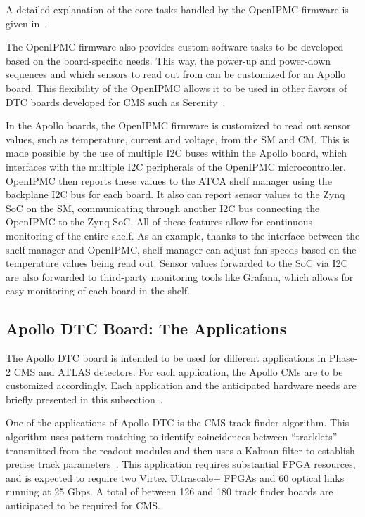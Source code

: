 A detailed explanation of the core tasks handled by the OpenIPMC firmware is given in~\cite{Calligaris:OpenIPMC}.

The OpenIPMC firmware also provides custom software tasks to be developed based on the board-specific needs.
This way, the power-up and power-down sequences and which sensors to read out from can be customized for an
Apollo board. This flexibility of the OpenIPMC allows it to be used in other flavors of DTC boards developed
for CMS such as Serenity~\cite{CMS:SerenityPaper}.

In the Apollo boards, the OpenIPMC firmware is customized to read out sensor values, such as temperature, 
current and voltage, from the SM and CM. 
This is made possible by the use of multiple I2C buses within the Apollo board, which
interfaces with the multiple I2C peripherals of the OpenIPMC microcontroller. OpenIPMC then reports these
values to the ATCA shelf manager using the backplane I2C bus for each board. It also can report sensor values
to the Zynq SoC on the SM, communicating through another I2C bus connecting the OpenIPMC to the Zynq SoC. 
All of these features allow for continuous 
monitoring of the entire shelf. As an example, thanks to the interface between the shelf manager and OpenIPMC,
shelf manager can adjust fan speeds based on the temperature values being read out. Sensor values forwarded to
the SoC via I2C are also forwarded to third-party monitoring tools like Grafana, which allows for easy monitoring
of each board in the shelf. 

\subsection{Apollo DTC Board: The Applications}

The Apollo DTC board is intended to be used for different applications in Phase-2 CMS and ATLAS detectors.
For each application, the Apollo CMs are to be customized accordingly. Each application and the anticipated
hardware needs are briefly presented in this subsection~\cite{CMS:ApolloPaper}.

One of the applications of Apollo DTC is the CMS track finder algorithm. This algorithm uses 
pattern-matching to identify coincidences between “tracklets”
transmitted from the readout modules and then uses a Kalman filter to establish precise track 
parameters~\cite{CMS:ApolloPaper}. This application requires substantial FPGA resources, and is expected
to require two Virtex Ultrascale+ FPGAs and 60 optical links running at 25 Gbps. A total of 
between 126 and 180 track finder boards are anticipated to be required for CMS.

